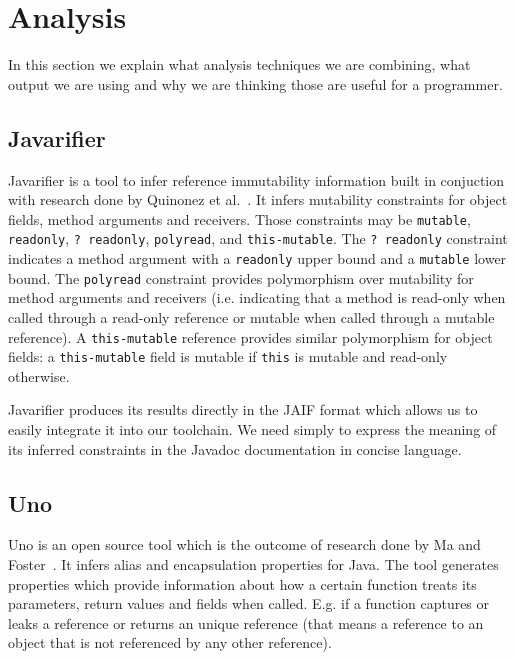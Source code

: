 \section{Analysis}

In this section we explain what analysis techniques we are combining, what
output we are using and why we are thinking those are useful for a programmer.

\subsection{Javarifier}
\label{sec:Javarifier}

Javarifier is a tool to infer reference immutability information built in
conjuction with research done by Quinonez et al.~\cite{Javarifier}. It infers
mutability constraints for object fields, method arguments and receivers. Those
constraints may be \texttt{mutable}, \texttt{readonly}, \texttt{?~readonly},
\texttt{polyread}, and \texttt{this-mutable}. The \texttt{?~readonly}
constraint indicates a method argument with a \texttt{readonly} upper bound and
a \texttt{mutable} lower bound. The \texttt{polyread} constraint provides
polymorphism over mutability for method arguments and receivers
(i.e. indicating that a method is read-only when called through a read-only
reference or mutable when called through a mutable reference). A
\texttt{this-mutable} reference provides similar polymorphism for object
fields: a \texttt{this-mutable} field is mutable if \texttt{this} is mutable
and read-only otherwise.

Javarifier produces its results directly in the JAIF format which allows us to
easily integrate it into our toolchain. We need simply to express the meaning
of its inferred constraints in the Javadoc documentation in concise language.

\subsection{Uno}

Uno is an open source tool which is the outcome of research done by Ma and
Foster~\cite{Uno}. It infers alias and encapsulation properties for Java.  The
tool generates properties which provide information about how a certain
function treats its parameters, return values and fields when called. 
E.g. if a function captures or leaks a reference or returns an unique 
reference (that means a reference to an object that is not referenced 
by any other reference).

